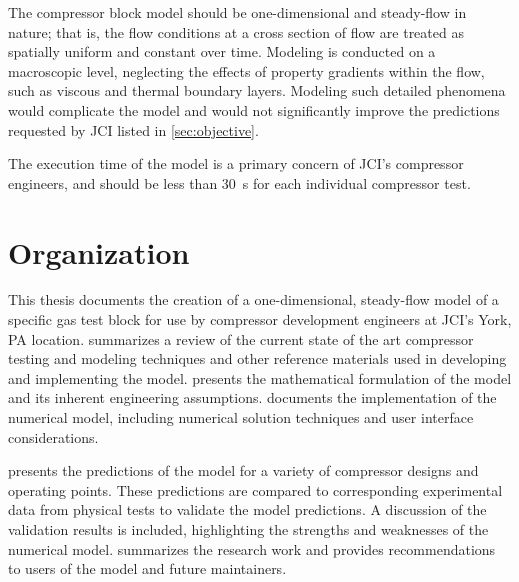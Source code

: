 The compressor block model should be one-dimensional and steady-flow in nature; 
that is, the flow conditions at a cross section of flow 
are treated as spatially uniform and constant over time. 
Modeling is conducted on a macroscopic level, 
neglecting the effects of property gradients within the flow, 
such as viscous and thermal boundary layers. 
Modeling such detailed phenomena would complicate the model 
and would not significantly improve the predictions requested by JCI listed in \cref{sec:objective}.

The execution time of the model is a primary concern of JCI's compressor engineers, 
and should be less than \SI{30}{\second} for each individual compressor test.

\section{Organization} \label{sec:organization}
This thesis documents the creation of a one-dimensional, steady-flow model 
of a specific gas test block for use by compressor development engineers at JCI's York, PA location. 
 summarizes a review of the current state of the art 
compressor testing and modeling techniques 
and other reference materials used in developing and implementing the model. 
 presents the mathematical formulation of the model 
and its inherent engineering assumptions. 
 documents the implementation of the numerical model, 
including numerical solution techniques and user interface considerations. 

 presents the predictions of the model 
for a variety of compressor designs and operating points. 
These predictions are compared to corresponding experimental data 
from physical tests to validate the model predictions.
A discussion of the validation results is included, 
highlighting the strengths and weaknesses of the numerical model.
 summarizes the research work 
and provides recommendations to users of the model and future maintainers.

\citet{flow1984}
